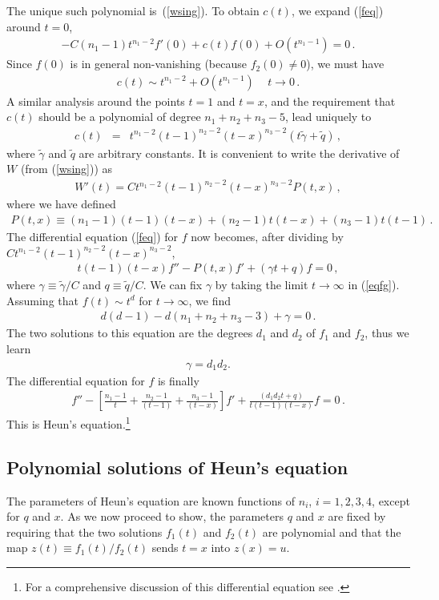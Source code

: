 \documentclass[letterpaper]{JHEP3}
\def\be{\begin{equation}}
\def\ee{\end{equation}}
\def\be{\begin{eqnarray}}
\def\ee{\end{eqnarray}}
\begin{document}
The unique such polynomial 
is~(\ref{wsing}).
To obtain $c(t)$, we expand  (\ref{feq}) around  $t = 0$,
\be
-C (n_1-1) t^{n_1-2} f'(0) + c(t) f(0) + O(t^{n_1-1}) =0\,. 
\ee
Since $f(0)$ is in general non-vanishing (because $f_2(0) \neq 0$), we must have
\be
c(t) \sim t^{n_1-2} + O(t^{n_1-1}) \, \quad t \to 0\,.
\label{clim}
\ee
A similar analysis around the points $t=1$ and $t=x$, and the requirement that $c(t)$ should be a polynomial of degree
$n_1+n_2+n_3-5$, 
lead uniquely to
\be
c(t)&=&  t^{n_1-2}(t-1)^{n_2-2}(t-x)^{n_3-2} \left( t \tilde{\gamma} + \tilde{q} \right) \, ,
\ee
where $\tilde{\gamma}$ and $\tilde{q}$ are arbitrary constants.
It is convenient to write the derivative of $W$ (from  (\ref{wsing})) as
\be
W'(t)= C t^{n_1-2}(t-1)^{n_2-2}(t-x)^{n_3-2} P(t,x) \, ,
\ee
where we have defined
\be
P(t,x) \equiv (n_1-1)(t-1)(t-x) + (n_2 -1)t(t-x) + (n_3-1)t(t-1)\,.
\ee
The differential equation (\ref{feq}) for $f$ now  becomes, after dividing by $C t^{n_1-2}(t-1)^{n_2-2}(t-x)^{n_3-2}$,
\be
t(t-1)(t-x) f'' - P(t,x) f' + ( \gamma t + q ) f =0 \,,
\label{eqfg}
\ee
where $\gamma \equiv \tilde{\gamma}/C$ and $q \equiv \tilde{q}/C$.
We can fix $\gamma$ by taking the limit $t\rightarrow \infty$ in (\ref{eqfg}).
Assuming that $ f(t) \sim t^{d}$ for $t \to \infty$, we find
\be
d(d-1) - d(n_1+n_2+n_3-3) +\gamma =0\,.
\label{eqforgamma}
\ee
The two solutions to this equation are the degrees $d_1$ and $d_2$ of $f_1$ and $f_2$,
thus we learn
\be
\gamma = d_1 d_2.
\ee
The differential equation for $f$ is finally
\be\label{heun}
 f''  - \left[ \frac{n_1-1}{t }  + \frac{n_2-1}{(t-1)} + \frac{n_3-1}{(t-x)} \right] f'
  + \frac{( d_1 d_2 t + q )}{t(t-1)(t-x)} f =0\,.
\ee
This is Heun's equation.\footnote{For a comprehensive discussion of this differential equation see \cite{heun}.}

\subsection{Polynomial solutions of Heun's equation}\label{polheun}


The parameters of Heun's equation are known functions of $n_i$, $i=1,2,3,4$, except for  $q$ and $x$.
As we now proceed to show,  the parameters $q$ and $x$
are fixed by requiring that the two solutions $f_1(t)$ and $f_2(t)$ 
 are polynomial and that the map  $z(t) \equiv f_1(t)/f_2(t)$ sends $t=x$ into $z(x)=u$.
\end{document}
